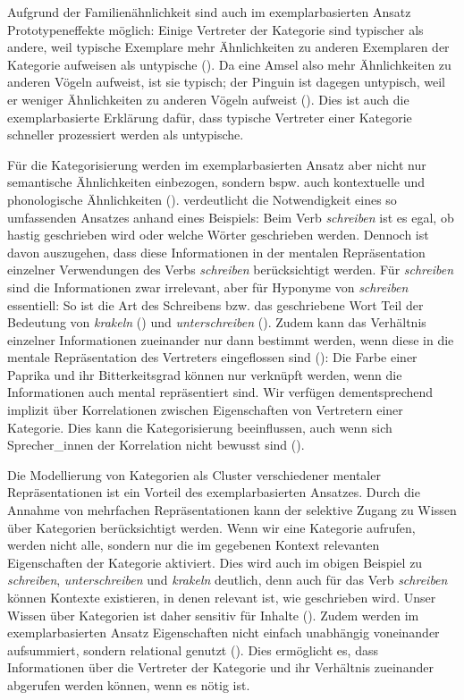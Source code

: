 Aufgrund der Familienähnlichkeit sind auch im exemplarbasierten Ansatz Prototypeneffekte möglich: Einige Vertreter der Kategorie sind typischer als andere, weil typische Exemplare mehr Ähnlichkeiten zu anderen Exemplaren der Kategorie aufweisen als untypische (\cite[213]{Ross.1999}). Da eine Amsel also mehr Ähnlichkeiten zu anderen Vögeln aufweist, ist sie typisch; der Pinguin ist dagegen untypisch, weil er weniger Ähnlichkeiten zu anderen Vögeln aufweist (\cite[213]{Ross.1999}). Dies ist auch die exemplarbasierte Erklärung dafür, dass typische Vertreter einer Kategorie schneller prozessiert werden als untypische. 



Für die Kategorisierung werden im exemplarbasierten Ansatz aber nicht nur semantische Ähnlichkeiten einbezogen, sondern bspw. auch kontextuelle und phonologische Ähnlichkeiten (\cite[716]{Bybee.2006b}). \textcite[15]{Goldberg.2019} verdeutlicht die Notwendigkeit eines so umfassenden Ansatzes anhand eines Beispiels: Beim Verb \textit{schreiben} ist es egal, ob hastig geschrieben wird oder welche Wörter geschrieben werden. Dennoch ist davon auszugehen, dass diese Informationen in der mentalen Repräsentation einzelner Verwendungen des Verbs \textit{schreiben} berücksichtigt werden. Für \textit{schreiben} sind die Informationen zwar irrelevant, aber für Hyponyme von \textit{schreiben} essentiell: So ist die Art des Schreibens bzw. das geschriebene Wort Teil der Bedeutung von \textit{krakeln} () und \textit{unterschreiben} (). Zudem kann das Verhältnis einzelner Informationen zueinander nur dann bestimmt werden, wenn diese in die mentale Repräsentation des Vertreters eingeflossen sind (\cite[214--215]{Ross.1999}): Die Farbe einer Paprika und ihr Bitterkeitsgrad können nur verknüpft werden, wenn die Informationen auch mental repräsentiert sind. Wir verfügen dementsprechend implizit über Korrelationen zwischen Eigenschaften von Vertretern einer Kategorie. Dies kann die Kategorisierung beeinflussen, auch wenn sich Sprecher\_innen der Korrelation nicht bewusst sind (\cite[214--215]{Ross.1999}).

Die Modellierung von Kategorien als Cluster verschiedener mentaler Repräsentationen ist ein Vorteil des exemplarbasierten Ansatzes. Durch die Annahme von mehrfachen Repräsentationen kann der selektive Zugang zu Wissen über Kategorien berücksichtigt werden. Wenn wir eine Kategorie aufrufen, werden nicht alle, sondern nur die im gegebenen Kontext relevanten Eigenschaften der Kategorie aktiviert.  Dies wird auch im obigen Beispiel zu \textit{schreiben}, \textit{unterschreiben} und \textit{krakeln} deutlich, denn auch für das Verb \textit{schreiben} können Kontexte existieren, in denen relevant ist, wie geschrieben wird. Unser Wissen über Kategorien ist daher sensitiv für Inhalte (\cite[52]{Goldberg.2019}). Zudem werden im exemplarbasierten Ansatz Eigenschaften nicht einfach unabhängig voneinander aufsummiert, sondern relational genutzt (\cite[216]{Ross.1999}). Dies ermöglicht es, dass Informationen über die Vertreter der Kategorie und ihr Verhältnis zueinander abgerufen werden können, wenn es nötig ist.  

